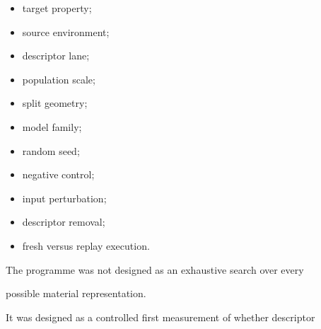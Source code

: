 \documentclass[11pt,a4paper,oneside]{report}
\begin{document}
\begin{itemize}



\item

target property;



\item

source environment;



\item

descriptor lane;



\item

population scale;



\item

split geometry;



\item

model family;



\item

random seed;



\item

negative control;



\item

input perturbation;



\item

descriptor removal;



\item

fresh versus replay execution.



\end{itemize}



The programme was not designed as an exhaustive search over every

possible material representation.



It was designed as a controlled first measurement of whether descriptor
\end{document}
